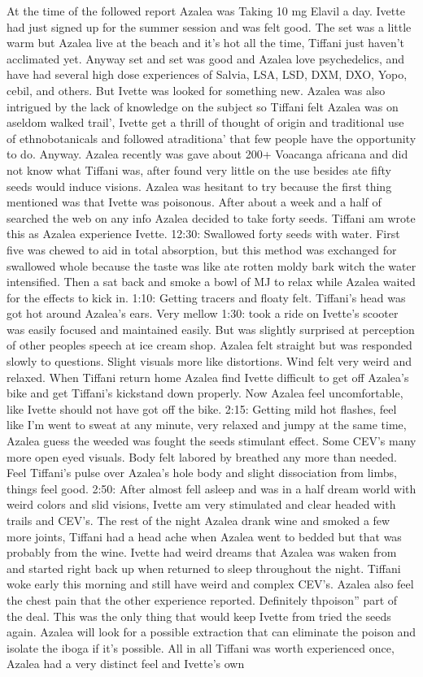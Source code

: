 \documentclass[12pt]{book}
\begin{document}
At the time of the followed report Azalea was Taking 10 mg Elavil a day. Ivette had just signed up for the summer session and was felt good. The set was a little warm but Azalea live at the beach and it's hot all the time, Tiffani just haven't acclimated yet. Anyway set and set was good and Azalea love psychedelics, and have had several high dose experiences of Salvia, LSA, LSD, DXM, DXO, Yopo, cebil, and others. But Ivette was looked for something new. Azalea was also intrigued by the lack of knowledge on the subject so Tiffani felt Azalea was on aseldom walked trail', Ivette get a thrill of thought of origin and traditional use of ethnobotanicals and followed atraditiona' that few people have the opportunity to do. Anyway. Azalea recently was gave about 200+ Voacanga africana and did not know what Tiffani was, after found very little on the use besides ate fifty seeds would induce visions. Azalea was hesitant to try because the first thing mentioned was that Ivette was poisonous. After about a week and a half of searched the web on any info Azalea decided to take forty seeds. Tiffani am wrote this as Azalea experience Ivette. 12:30: Swallowed forty seeds with water. First five was chewed to aid in total absorption, but this method was exchanged for swallowed whole because the taste was like ate rotten moldy bark witch the water intensified. Then a sat back and smoke a bowl of MJ to relax while Azalea waited for the effects to kick in. 1:10: Getting tracers and floaty felt. Tiffani's head was got hot around Azalea's ears. Very mellow 1:30: took a ride on Ivette's scooter was easily focused and maintained easily. But was slightly surprised at perception of other peoples speech at ice cream shop. Azalea felt straight but was responded slowly to questions. Slight visuals more like distortions. Wind felt very weird and relaxed. When Tiffani return home Azalea find Ivette difficult to get off Azalea's bike and get Tiffani's kickstand down properly. Now Azalea feel uncomfortable, like Ivette should not have got off the bike. 2:15: Getting mild hot flashes, feel like I'm went to sweat at any minute, very relaxed and jumpy at the same time, Azalea guess the weeded was fought the seeds stimulant effect. Some CEV's many more open eyed visuals. Body felt labored by breathed any more than needed. Feel Tiffani's pulse over Azalea's hole body and slight dissociation from limbs, things feel good. 2:50: After almost fell asleep and was in a half dream world with weird colors and slid visions, Ivette am very stimulated and clear headed with trails and CEV's. The rest of the night Azalea drank wine and smoked a few more joints, Tiffani had a head ache when Azalea went to bedded but that was probably from the wine. Ivette had weird dreams that Azalea was waken from and started right back up when returned to sleep throughout the night. Tiffani woke early this morning and still have weird and complex CEV's. Azalea also feel the chest pain that the other experience reported. Definitely thpoison'' part of the deal. This was the only thing that would keep Ivette from tried the seeds again. Azalea will look for a possible extraction that can eliminate the poison and isolate the iboga if it's possible. All in all Tiffani was worth experienced once, Azalea had a very distinct feel and Ivette's own 
\end{document}
